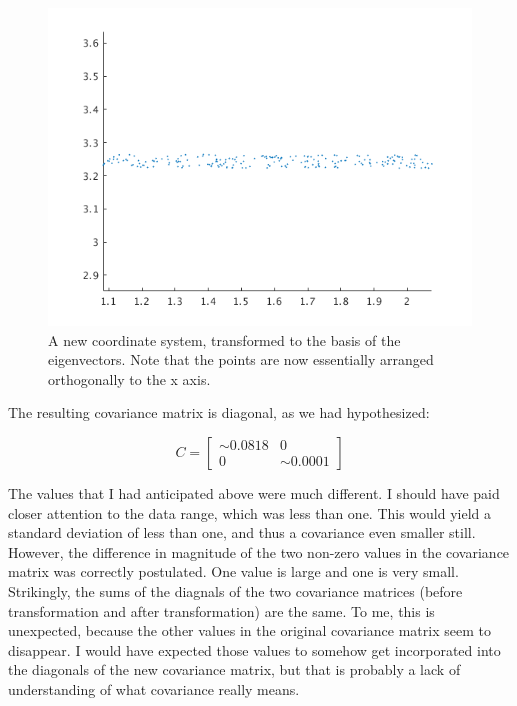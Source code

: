 \documentclass{article}
\begin{document}
\begin{figure}[!ht]
	\centering
	\includegraphics[width=120mm]{figs/pca_complete.png}
	\caption{A new coordinate system, transformed to the basis of the 
        eigenvectors. Note that the points are now essentially arranged 
        orthogonally to the x axis.}
\end{figure}

The resulting covariance matrix is diagonal, as we had hypothesized:

$$
C = \begin{bmatrix}
\sim 0.0818 & 0 \\
0 & \sim 0.0001
\end{bmatrix}
$$

The values that I had anticipated above were much different. I should have 
paid closer attention to the data range, which was less than one. This would 
yield a standard deviation of less than one, and thus a covariance even smaller 
still. However, the difference in magnitude of the two non-zero values in the 
covariance matrix was correctly postulated. One value is large and one is very 
small. Strikingly, the sums of the diagnals of the two covariance matrices 
(before transformation and after transformation) are the same. To me, this is 
unexpected, because the other values in the original covariance matrix seem 
to disappear. I would have expected those values to somehow get incorporated 
into the diagonals of the new covariance matrix, but that is probably a lack 
of understanding of what covariance really means.
\end{document}
